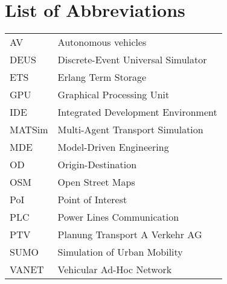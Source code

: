 \chapter*{List of Abbreviations}
\begin{tabular}{ll}

        AV      & Autonomous vehicles \\
        DEUS    & Discrete-Event Universal Simulator \\
        ETS     & Erlang Term Storage \\
        GPU     & Graphical Processing Unit \\
        IDE     & Integrated Development Environment\\
        MATSim  & Multi-Agent Transport Simulation \\
        MDE     & Model-Driven Engineering \\ 
        OD      & Origin-Destination\\
        OSM     & Open Street Maps\\
        PoI     & Point of Interest \\
        PLC     & Power Lines Communication \\ 
        PTV     & Planung Transport A Verkehr AG \\
        SUMO    & Simulation of Urban Mobility \\
        VANET   & Vehicular Ad-Hoc Network \\
        
        
\end{tabular}


{\let\cleardoublepage\relax {} \listoffigures }

{\let\cleardoublepage\relax {} \listoftables }

\tableofcontents

